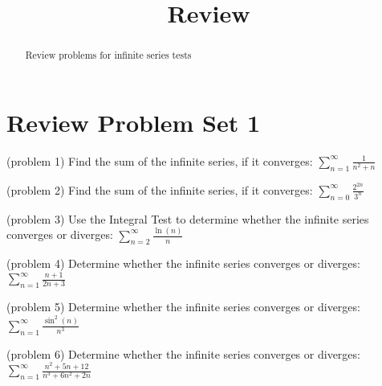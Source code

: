 \documentclass[handout]{ximera}
\title{Review}
\begin{document}
\begin{abstract}
Review problems for infinite series tests
\end{abstract}

\maketitle

\section{Review Problem Set 1}





\begin{problem}(problem 1)
Find the sum of the infinite series, if it converges: $\displaystyle\sum_{n=1}^\infty \frac{1}{n^2 +n}$

\end{problem}


\begin{problem}(problem 2)
Find the sum of the infinite series, if it converges: $\displaystyle \sum_{n=0}^\infty \frac{2^{2n}}{3^n}$

\end{problem}

\begin{problem}(problem 3)
Use the Integral Test to determine whether the infinite series converges or diverges:  $\displaystyle \sum_{n=2}^\infty \frac{\ln(n)}{n}$

\end{problem}

\begin{problem}(problem 4)
Determine whether the infinite series converges or diverges: $\displaystyle \sum_{n=1}^\infty \frac{n+1}{2n+3}$

\end{problem}

\begin{problem}(problem 5)
Determine whether the infinite series converges or diverges: $\displaystyle \sum_{n=1}^\infty \frac{\sin^2(n)}{n^3}$

\end{problem}

\begin{problem}(problem 6)
Determine whether the infinite series converges or diverges: $\displaystyle \sum_{n=1}^\infty \frac{n^2 + 5n + 12}{n^3 + 6n^2 + 2n}$

\end{problem}
\end{document}
